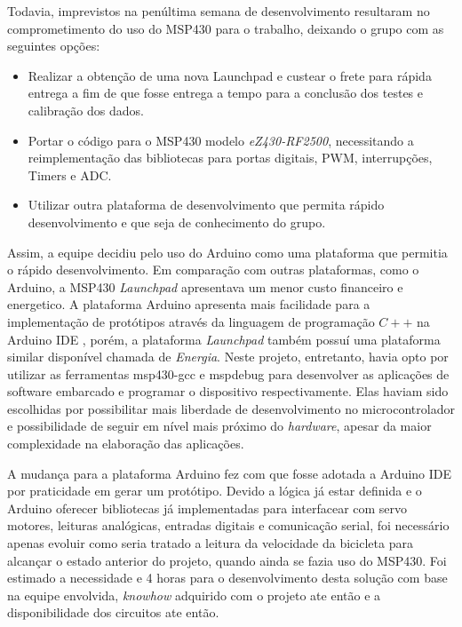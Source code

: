 Todavia, imprevistos na penúltima semana de desenvolvimento resultaram no comprometimento do uso do MSP430 para o trabalho, deixando o grupo com as seguintes opções:

\begin{itemize}
  \item Realizar a obtenção de uma nova Launchpad e custear o frete para rápida entrega a fim de que fosse entrega a tempo para a conclusão dos testes e calibração dos dados.
  \item Portar o código para o MSP430 modelo \textit{eZ430-RF2500}, necessitando a reimplementação das bibliotecas para portas digitais, PWM, interrupções, Timers e ADC.
  \item Utilizar outra plataforma de desenvolvimento que permita rápido desenvolvimento e que seja de conhecimento do grupo.
\end{itemize}

Assim, a equipe decidiu pelo uso do Arduino como uma plataforma que permitia o rápido desenvolvimento. 
%
Em comparação com outras plataformas, como o Arduino, a MSP430 \textit{Launchpad} apresentava um menor custo financeiro e energetico. A plataforma Arduino apresenta mais facilidade para a implementação de protótipos através da linguagem de programação $C++$ na Arduino IDE , porém, a plataforma \textit{Launchpad} também possuí uma plataforma similar disponível chamada de \textit{Energia}. Neste projeto, entretanto, havia opto por utilizar as ferramentas {\code msp430-gcc} e {\code mspdebug} para desenvolver as aplicações de software embarcado e programar o dispositivo respectivamente. Elas haviam sido escolhidas por possibilitar mais liberdade de desenvolvimento no microcontrolador e possibilidade de seguir em nível mais próximo do \textit{hardware}, apesar da maior complexidade na elaboração das aplicações.

A mudança para a plataforma Arduino fez com que fosse adotada a Arduino IDE por praticidade em gerar um protótipo. Devido a lógica já estar definida e o Arduino oferecer bibliotecas já implementadas para interfacear com servo motores, leituras analógicas, entradas digitais e comunicação serial, foi necessário apenas evoluir como seria tratado a leitura da velocidade da bicicleta para alcançar o estado anterior do projeto, quando ainda se fazia uso do MSP430. Foi estimado a necessidade e 4 horas para o desenvolvimento desta solução com base na equipe envolvida, \textit{knowhow} adquirido com o projeto ate então e a disponibilidade dos circuitos ate então.



